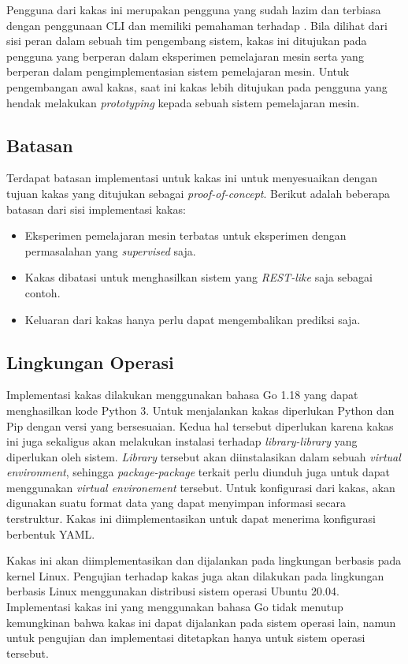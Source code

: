 Pengguna dari kakas ini merupakan pengguna yang sudah lazim dan terbiasa dengan penggunaan CLI dan memiliki pemahaman terhadap .
Bila dilihat dari sisi peran dalam sebuah tim pengembang sistem, kakas ini ditujukan pada pengguna yang berperan dalam eksperimen pemelajaran mesin serta yang berperan dalam pengimplementasian sistem pemelajaran mesin.
Untuk pengembangan awal kakas, saat ini kakas lebih ditujukan pada pengguna yang hendak melakukan \textit{prototyping} kepada sebuah sistem pemelajaran mesin.

\subsection{Batasan}

Terdapat batasan implementasi untuk kakas ini untuk menyesuaikan dengan tujuan kakas yang ditujukan sebagai \textit{proof-of-concept}.
Berikut adalah beberapa batasan dari sisi implementasi kakas:

\begin{itemize}
    \item Eksperimen pemelajaran mesin terbatas untuk eksperimen dengan permasalahan yang \textit{supervised} saja.
    \item Kakas dibatasi untuk menghasilkan sistem yang \textit{REST-like} saja sebagai contoh.
    \item Keluaran dari kakas hanya perlu dapat mengembalikan prediksi saja.
\end{itemize}

\subsection{Lingkungan Operasi}

Implementasi kakas dilakukan menggunakan bahasa Go 1.18 yang dapat menghasilkan kode Python 3.
Untuk menjalankan kakas diperlukan Python dan Pip dengan versi yang bersesuaian.
Kedua hal tersebut diperlukan karena kakas ini juga sekaligus akan melakukan instalasi terhadap \textit{library-library} yang diperlukan oleh sistem.
\textit{Library} tersebut akan diinstalasikan dalam sebuah \textit{virtual environment}, sehingga \textit{package-package} terkait perlu diunduh juga untuk dapat menggunakan \textit{virtual environement} tersebut.
Untuk konfigurasi dari kakas, akan digunakan suatu format data yang dapat menyimpan informasi secara terstruktur.
Kakas ini diimplementasikan untuk dapat menerima konfigurasi berbentuk YAML.

Kakas ini akan diimplementasikan dan dijalankan pada lingkungan berbasis pada kernel Linux.
Pengujian terhadap kakas juga akan dilakukan pada lingkungan berbasis Linux menggunakan distribusi sistem operasi Ubuntu 20.04.
Implementasi kakas ini yang menggunakan bahasa Go tidak menutup kemungkinan bahwa kakas ini dapat dijalankan pada sistem operasi lain, namun untuk pengujian dan implementasi ditetapkan hanya untuk sistem operasi tersebut.

